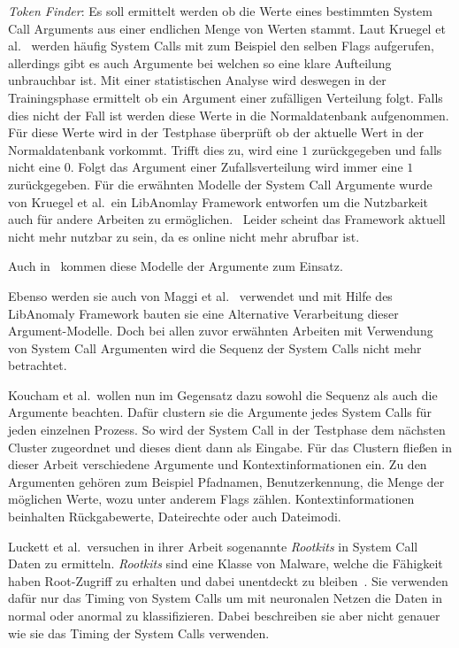         \textit{Token Finder}: Es soll ermittelt werden ob die Werte eines bestimmten System Call Arguments aus einer endlichen Menge von Werten stammt.
        Laut Kruegel et al.~\cite{ARGUMENTS} werden häufig System Calls mit zum Beispiel den selben Flags aufgerufen, allerdings gibt es auch Argumente bei welchen so eine klare Aufteilung unbrauchbar ist.
        Mit einer statistischen Analyse wird deswegen in der Trainingsphase ermittelt ob ein Argument einer zufälligen Verteilung folgt.
        Falls dies nicht der Fall ist werden diese Werte in die Normaldatenbank aufgenommen.
        Für diese Werte wird in der Testphase überprüft ob der aktuelle Wert in der Normaldatenbank vorkommt.
        Trifft dies zu, wird eine $1$ zurückgegeben und falls nicht eine $0$.
        Folgt das Argument einer Zufallsverteilung wird immer eine $1$ zurückgegeben.
        Für die erwähnten Modelle der System Call Argumente wurde von Kruegel et al.\ ein LibAnomlay Framework entworfen um die Nutzbarkeit auch für andere Arbeiten zu ermöglichen.~\cite{ARGUMENTS}
        Leider scheint das Framework aktuell nicht mehr nutzbar zu sein, da es online nicht mehr abrufbar ist.

        Auch in~\cite{ARGUMENTS2} kommen diese Modelle der Argumente zum Einsatz.
        
        Ebenso werden sie auch von Maggi et al.~\cite{MAGGI} verwendet und mit Hilfe des LibAnomaly Framework bauten sie eine Alternative Verarbeitung dieser Argument-Modelle.
        Doch bei allen zuvor erwähnten Arbeiten mit Verwendung von System Call Argumenten wird die Sequenz der System Calls nicht mehr betrachtet.

        Koucham et al.\ wollen nun im Gegensatz dazu sowohl die Sequenz als auch die Argumente beachten.
        Dafür clustern sie die Argumente jedes System Calls für jeden einzelnen Prozess.
        So wird der System Call in der Testphase dem nächsten Cluster zugeordnet und dieses dient dann als Eingabe.
        Für das Clustern fließen in dieser Arbeit verschiedene Argumente und Kontextinformationen ein.
        Zu den Argumenten gehören zum Beispiel Pfadnamen, Benutzerkennung, die Menge der möglichen Werte, wozu unter anderem Flags zählen.
        Kontextinformationen beinhalten Rückgabewerte, Dateirechte oder auch Dateimodi.~\cite{ARGUMENTCLUSTERKOUCHAM2015}

        Luckett et al.\ versuchen in ihrer Arbeit sogenannte \textit{Rootkits} in System Call Daten zu ermitteln.
        \textit{Rootkits} sind eine Klasse von Malware, welche die Fähigkeit haben Root-Zugriff zu erhalten und dabei unentdeckt zu bleiben~\cite{OSSECBRAY2008}.
        Sie verwenden dafür nur das Timing von System Calls um mit neuronalen Netzen die Daten in normal oder anormal zu klassifizieren.
        Dabei beschreiben sie aber nicht genauer wie sie das Timing der System Calls verwenden.~\cite{TIMINGLUCKETT2016}

